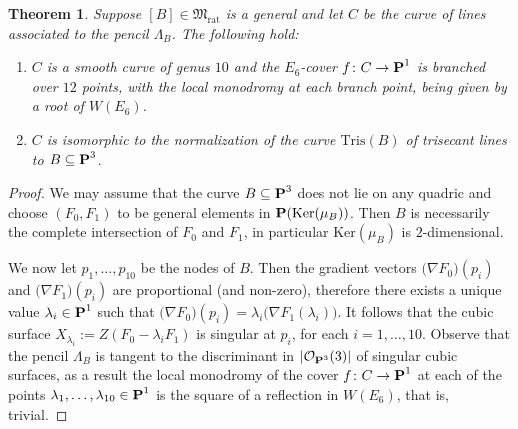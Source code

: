 \documentclass[11pt]{amsart}
\newtheorem{theorem}{Theorem}[section]
\theoremstyle{definition}
\def\PP{{\textbf P}}
\def\OO{\mathcal{O}}
\begin{document}
\begin{theorem}\label{thm:curve_of_lines}
Suppose $[B]\in \mathfrak{M}_{\mathrm{rat}}$ is a general and let $C$ be the curve of lines associated to the pencil $\Lambda_B$. The following hold:
\begin{enumerate}
\item $C$ is a smooth curve of genus $10$ and the $E_6$-cover
$f\colon C\rightarrow \PP^1$ is branched over  $12$ points, with the local monodromy at each branch point, being given by a root of $W(E_6)$.
\item $C$ is isomorphic to the normalization of the curve $\mathrm{Tris}(B)$
of trisecant lines to $B\subseteq \PP^3$.
\end{enumerate}
\end{theorem}
\begin{proof}
We may assume that the curve $B\subseteq \PP^3$ does not lie on any quadric and choose $(F_0, F_1)$ to be general elements in $\PP(\mbox{Ker}(\mu_B))$. Then $B$ is necessarily the complete intersection of $F_0$ and $F_1$, in particular $\mbox{Ker}(\mu_B)$ is $2$-dimensional. 

\vskip 3pt

We now let $p_1, \ldots, p_{10}$ be the nodes of $B$.
Then the gradient vectors $\bigl(\nabla F_0\bigr)(p_i)$ and $\bigl(\nabla F_1\bigr)(p_i)$ are proportional (and non-zero), therefore there exists a unique value $\lambda_i\in \PP^1$ such that $\bigl(\nabla F_0)(p_i)=\lambda_i\bigl(\nabla F_1(\lambda_i)\bigr)$. It follows that the cubic surface $X_{\lambda_i}:=Z(F_0-\lambda_iF_1)$ is  singular at $p_i$, for each $i=1, \ldots, 10$. 
Observe that the pencil $\Lambda_B$ is tangent to the discriminant in $|\OO_{\PP^3}(3)|$ of singular cubic surfaces, as a result the local monodromy of the cover $f\colon C\rightarrow \PP^1$ at each of the points $\lambda_1, \ldots, \lambda_{10}\in \PP^1$ is the square of a reflection in $W(E_6)$, that is, trivial.
\vskip 3pt


\end{proof}
\end{document}
